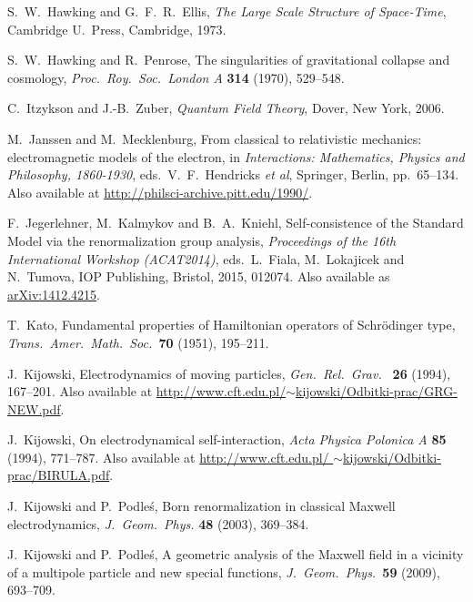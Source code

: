 \documentclass{article}
\begin{document}
\begin{thebibliography}{10}
 S.\ W.\ Hawking and G.\ F.\ R.\ Ellis, \textsl{The Large Scale Structure of Space-Time}, Cambridge U.\ Press, Cambridge, 1973.

 S.\ W.\ Hawking and R.\ Penrose, The singularities of gravitational collapse and cosmology, \textsl{Proc.\ Roy.\ Soc.\ London A} \textbf{314} (1970), 529--548.

 C.\ Itzykson and J.-B.\ Zuber, \textsl{Quantum Field Theory}, Dover, New York, 2006.

 M.\ Janssen and M.\ Mecklenburg, From classical to relativistic mechanics: electromagnetic models of the electron, in \textsl{Interactions: Mathematics, Physics and Philosophy, 1860-1930}, eds.\ V.\ F.\ Hendricks \textit{et al}, Springer, Berlin, pp.\ 65--134.  Also available at \href{http://philsci-archive.pitt.edu/1990/}{http://philsci-archive.pitt.edu/1990/}.

 F.\ Jegerlehner, M.\ Kalmykov and B.\ A.\ Kniehl, Self-consistence of the Standard Model via the renormalization group analysis, \textsl{Proceedings of the 16th International Workshop (ACAT2014)}, eds.\ L.\ Fiala, M.\ Lokajicek and N.\ Tumova, IOP Publishing, Bristol, 2015, 012074. Also available as \href{http://arxiv.org/abs/1412.4215}{arXiv:1412.4215}.

 T.\ Kato, Fundamental properties of Hamiltonian operators of Schr\"odinger type, \textit{Trans.\ Amer.\ Math.\ Soc.\ }{\bf 70} (1951), 195--211.

 J.\ Kijowski, Electrodynamics of moving particles, 
\textsl{Gen.\ Rel.\ Grav.\ } \textbf{26} (1994), 167--201.  Also available at
\href{http://www.cft.edu.pl/~kijowski/Odbitki-prac/GRG-NEW.pdf}
{http://www.cft.edu.pl/\break $\sim$kijowski/Odbitki-prac/GRG-NEW.pdf}.

 J.\ Kijowski, On electrodynamical self-interaction, 
\textsl{Acta Physica Polonica A} \textbf{85} (1994), 771--787.
Also available at \href{http://www.cft.edu.pl/~kijowski/Odbitki-prac/BIRULA.pdf}
{http://www.cft.edu.pl/ \break $\sim$kijowski/Odbitki-prac/BIRULA.pdf}.

 J.\ Kijowski and P.\ Podle\'s, Born renormalization in classical Maxwell electrodynamics, \textsl{J.\ Geom.\ Phys.} \textbf{48} (2003), 369--384.

 J.\ Kijowski and P.\ Podle\'s, A geometric analysis of the Maxwell field in a vicinity of a multipole particle and new special functions, \textsl{J.\ Geom.\ Phys.\ }\textbf{59} (2009), 693--709.
 

\end{thebibliography}
\end{document}
